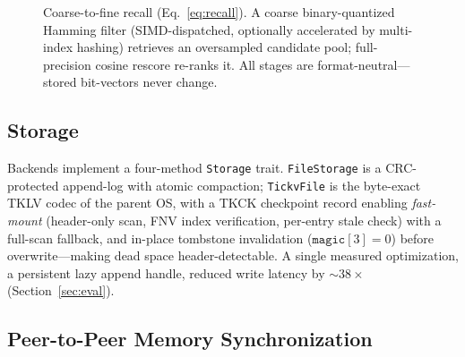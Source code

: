 \documentclass[11pt,twocolumn]{article}
\begin{document}
\begin{figure}[t]
\centering
{}
\caption{Coarse-to-fine recall (Eq.~\ref{eq:recall}). A coarse binary-quantized
Hamming filter (SIMD-dispatched, optionally accelerated by multi-index hashing)
retrieves an oversampled candidate pool; full-precision cosine rescore re-ranks
it. All stages are format-neutral---stored bit-vectors never change.}
\label{fig:recall}
\end{figure}

\subsection{Storage}
\label{sec:storage}

Backends implement a four-method \texttt{Storage} trait. \texttt{FileStorage}
is a CRC-protected append-log with atomic compaction; \texttt{TickvFile} is
the byte-exact TKLV codec of the parent OS, with a TKCK checkpoint record
enabling \emph{fast-mount} (header-only scan, FNV index verification, per-entry
stale check) with a full-scan fallback, and in-place tombstone invalidation
($\texttt{magic}[3]{=}0$) before overwrite---making dead space
header-detectable. A single measured optimization, a persistent lazy append
handle, reduced write latency by $\sim 38\times$ (Section~\ref{sec:eval}).

\subsection{Peer-to-Peer Memory Synchronization}
\label{sec:sync}
\end{document}
